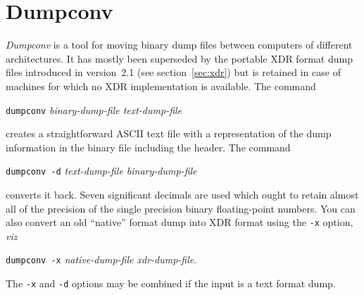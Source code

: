 \section{Dumpconv}%
\label{sec:dumpconv}
{\em Dumpconv\/} is a tool for moving binary dump files between
computers of different architectures.  It has mostly been superseded
by the portable XDR format dump files introduced in version~2.1 (see
section~\ref{sec:xdr}) but is retained in case of machines for which
no XDR implementation is available.  The command
\begin{center}
\verb'dumpconv' {\em binary-dump-file text-dump-file} 
\end{center}
creates a straightforward ASCII text file with a representation of the
dump information in the binary file including the header.  The command
\begin{center}
\verb'dumpconv -d' {\em text-dump-file binary-dump-file} 
\end{center}
converts it back.  Seven significant decimals are used which ought to
retain almost all of the precision of the single precision binary
floating-point numbers.  You can also convert an old ``native'' format
dump into XDR format using the \verb'-x' option, {\em viz\/}
\begin{center}
\verb'dumpconv -x' {\em native-dump-file xdr-dump-file}. 
\end{center}
The \verb'-x' and \verb'-d' options may be combined if the input is a
text format dump.
